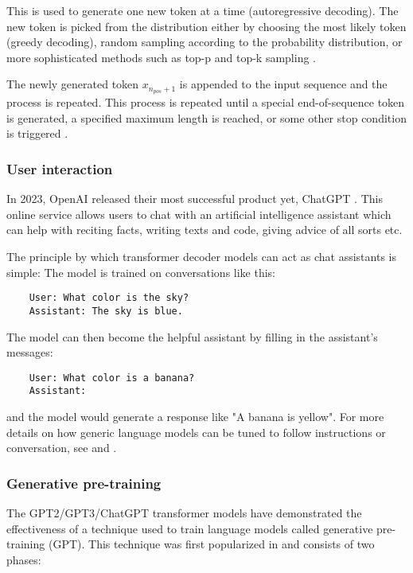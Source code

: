 This is used to generate one new token at a time (autoregressive decoding). The new token is picked from the distribution either by choosing the most likely token (greedy decoding), random sampling according to the probability distribution, or more sophisticated methods such as top-p and top-k sampling \cite{ippolito2019comparison}.

The newly generated token $x_{n_{pos}+1}$ is appended to the input sequence and the process is repeated. This process is repeated until a special end-of-sequence token is generated, a specified maximum length is reached, or some other stop condition is triggered \cite[sect. "Generation"]{HuggingFaceGPT2}.

\subsubsection{User interaction}

In 2023, OpenAI released their most successful product yet, ChatGPT \cite{openai_chatgpt_2022}. This online service allows users to chat with an artificial intelligence assistant which can help with reciting facts, writing texts and code, giving advice of all sorts etc.

The principle by which transformer decoder models can act as chat assistants is simple: The model is trained on conversations like this:

\begin{verbatim}
    User: What color is the sky?
    Assistant: The sky is blue.
\end{verbatim}

The model can then become the helpful assistant by filling in the assistant's messages:

\begin{verbatim}
    User: What color is a banana?
    Assistant:
\end{verbatim}

and the model would generate a response like "A banana is yellow". For more details on how generic language models can be tuned to follow instructions or conversation, see \cite{yi2019coherent} and \cite{ouyang2022training}.

\subsubsection{Generative pre-training}

The GPT2/GPT3/ChatGPT transformer models have demonstrated the effectiveness of a technique used to train language models called generative pre-training (GPT). This technique was first popularized in \cite{improvinglu} and consists of two phases:

